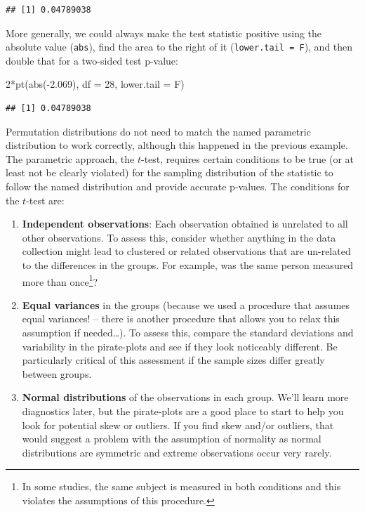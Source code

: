 \documentclass[
]{book}
\newenvironment{Shaded}{\begin{snugshade}}{\end{snugshade}}
\newcommand{\AttributeTok}[1]{\textcolor[rgb]{0.77,0.63,0.00}{#1}}
\newcommand{\DecValTok}[1]{\textcolor[rgb]{0.00,0.00,0.81}{#1}}
\newcommand{\FloatTok}[1]{\textcolor[rgb]{0.00,0.00,0.81}{#1}}
\newcommand{\FunctionTok}[1]{\textcolor[rgb]{0.00,0.00,0.00}{#1}}
\newcommand{\NormalTok}[1]{#1}
\newcommand{\SpecialCharTok}[1]{\textcolor[rgb]{0.00,0.00,0.00}{#1}}
\begin{document}
\begin{verbatim}
## [1] 0.04789038
\end{verbatim}

More generally, we could always make the test statistic positive using the
absolute value (\texttt{abs}), find the area to the right of it (\texttt{lower.tail\ =\ F}), and then double that for a
two-sided test p-value:

\begin{Shaded}
\begin{Highlighting}[]
\DecValTok{2}\SpecialCharTok{*}\FunctionTok{pt}\NormalTok{(}\FunctionTok{abs}\NormalTok{(}\SpecialCharTok{{-}}\FloatTok{2.069}\NormalTok{), }\AttributeTok{df =} \DecValTok{28}\NormalTok{, }\AttributeTok{lower.tail =}\NormalTok{ F)}
\end{Highlighting}
\end{Shaded}

\begin{verbatim}
## [1] 0.04789038
\end{verbatim}

\indent Permutation distributions  do not need to match the named
parametric distribution
to work correctly, although this happened in the previous example.
The parametric approach, the \(t\)-test, requires certain conditions to be true (or at least not be clearly violated)
for the sampling distribution of the
statistic to follow the named distribution and provide accurate p-values. The
conditions for the \(t\)-test are:

\begin{enumerate}
\def\labelenumi{\arabic{enumi}.}
\item
  \textbf{Independent observations}:
  Each observation obtained is unrelated to all other
  observations. To assess this, consider whether anything in the data collection
  might lead to clustered or related observations that are un-related to the
  differences in the groups. For example, was the same person measured more than
  once\footnote{In some studies, the same subject is measured in both conditions and
    this violates the assumptions of this procedure.}?
\item
  \textbf{Equal variances} in the groups (because we used a procedure that assumes
  equal variances! -- there is another procedure that allows you to relax this
  assumption if needed\ldots). To assess this, compare the standard deviations and
  variability in the pirate-plots  and see if they look noticeably different. Be
  particularly critical of this assessment if the sample sizes differ greatly
  between groups.
\item
  \textbf{Normal distributions} of the observations in each group. We'll learn more
  diagnostics later, but the pirate-plots are a good place to start to
  help you look for potential skew or outliers. If you find
  skew and/or outliers, that would suggest a problem with the assumption of
  normality as normal distributions
    
  are symmetric and extreme observations occur
  very rarely.
\end{enumerate}
\end{document}
